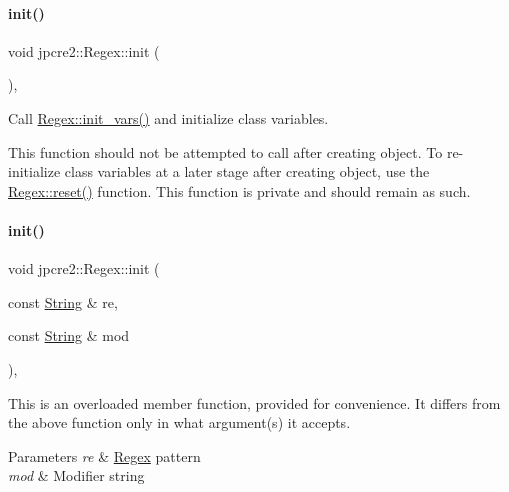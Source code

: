 \paragraph{\texorpdfstring{init()}{init()}\hspace{0.1cm}{\footnotesize\ttfamily [1/3]}}
{\footnotesize\ttfamily void jpcre2\+::\+Regex\+::init (\begin{DoxyParamCaption}{ }\end{DoxyParamCaption})\hspace{0.3cm}{\ttfamily [inline]}, {\ttfamily [private]}}



Call \hyperlink{classjpcre2_1_1Regex_aff1f5cd95b6ac227014e7a5265a50cc0}{Regex\+::init\+\_\+vars()} and initialize class variables. 

This function should not be attempted to call after creating object. To re-\/initialize class variables at a later stage after creating object, use the \hyperlink{classjpcre2_1_1Regex_a91f6afe257e9633cbb79a98649ab8d02_a91f6afe257e9633cbb79a98649ab8d02}{Regex\+::reset()} function. This function is private and should remain as such. \hypertarget{classjpcre2_1_1Regex_aedc5f414e5fa401e1a91614cfab0b033_aedc5f414e5fa401e1a91614cfab0b033}{}\label{classjpcre2_1_1Regex_aedc5f414e5fa401e1a91614cfab0b033_aedc5f414e5fa401e1a91614cfab0b033} 
\paragraph{\texorpdfstring{init()}{init()}\hspace{0.1cm}{\footnotesize\ttfamily [2/3]}}
{\footnotesize\ttfamily void jpcre2\+::\+Regex\+::init (\begin{DoxyParamCaption}\item[{const \hyperlink{namespacejpcre2_a91f03070152fb228bc116c5a737f1d16}{String} \&}]{re,  }\item[{const \hyperlink{namespacejpcre2_a91f03070152fb228bc116c5a737f1d16}{String} \&}]{mod }\end{DoxyParamCaption})\hspace{0.3cm}{\ttfamily [inline]}, {\ttfamily [private]}}



This is an overloaded member function, provided for convenience. It differs from the above function only in what argument(s) it accepts. 


\begin{DoxyParams}{Parameters}
{\em re} & \hyperlink{classjpcre2_1_1Regex}{Regex} pattern \\
\hline
{\em mod} & Modifier string \\
\hline
\end{DoxyParams}
\hypertarget{classjpcre2_1_1Regex_adbda074677e393438452190e55a971d0_adbda074677e393438452190e55a971d0}{}\label{classjpcre2_1_1Regex_adbda074677e393438452190e55a971d0_adbda074677e393438452190e55a971d0} 

